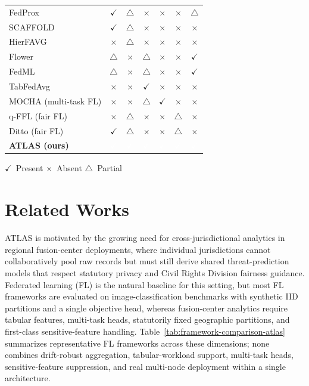 \documentclass[conference]{IEEEtran}
\newcommand{\cmarkc}{\cellcolor{goodgreen}\textcolor{black!55}{\scriptsize$\checkmark$}}
\newcommand{\xmarkc}{\cellcolor{badred}\textcolor{black!40}{\scriptsize$\times$}}
\newcommand{\tmarkc}{\cellcolor{nayellow}\textcolor{black!65}{\scriptsize$\triangle$}}
\newcommand{\cmarkA}{\cellcolor{atlasgreen}\textcolor{white}{\textbf{\scriptsize$\checkmark$}}}
\begin{document}
\begin{table}[!t]
{\begin{tabular}{l c c c c c c}
FedProx \scriptsize\cite{li2020fedprox}                     & \cmarkc & \tmarkc & \xmarkc & \xmarkc & \xmarkc & \tmarkc \\
SCAFFOLD \scriptsize\cite{karimireddy2020scaffold}          & \cmarkc & \tmarkc & \xmarkc & \xmarkc & \xmarkc & \xmarkc \\
HierFAVG \scriptsize\cite{liu2020hierfl}                    & \xmarkc & \tmarkc & \xmarkc & \xmarkc & \xmarkc & \xmarkc \\
Flower \scriptsize\cite{beutel2020flower}                   & \tmarkc & \xmarkc & \tmarkc & \xmarkc & \xmarkc & \cmarkc \\
FedML \scriptsize\cite{he2020fedml}                         & \tmarkc & \xmarkc & \tmarkc & \xmarkc & \xmarkc & \cmarkc \\
TabFedAvg \scriptsize\cite{wang2022tabular}                 & \xmarkc & \xmarkc & \cmarkc & \xmarkc & \xmarkc & \xmarkc \\
MOCHA (multi-task FL) \scriptsize\cite{smith2017mocha}      & \xmarkc & \xmarkc & \tmarkc & \cmarkc & \xmarkc & \xmarkc \\
q-FFL (fair FL) \scriptsize\cite{li2020qffl}                & \xmarkc & \tmarkc & \xmarkc & \xmarkc & \tmarkc & \xmarkc \\
Ditto (fair FL) \scriptsize\cite{li2021ditto}               & \cmarkc & \tmarkc & \xmarkc & \xmarkc & \tmarkc & \xmarkc \\
\midrule
\textbf{ATLAS (ours)}                                       & \cmarkA & \cmarkA & \cmarkA & \cmarkA & \cmarkA & \cmarkA \\
\bottomrule
\end{tabular}%
}
\vspace{2pt}
{\footnotesize \cmarkc\ Present \quad \xmarkc\ Absent \quad \tmarkc\ Partial}
\end{table}

\section{Related Works}
\label{sec:related_works}

ATLAS is motivated by the growing need for cross-jurisdictional analytics in regional fusion-center deployments, where individual jurisdictions cannot collaboratively pool raw records but must still derive shared threat-prediction models that respect statutory privacy and Civil Rights Division fairness guidance. Federated learning (FL) is the natural baseline for this setting, but most FL frameworks are evaluated on image-classification benchmarks with synthetic IID partitions and a single objective head, whereas fusion-center analytics require tabular features, multi-task heads, statutorily fixed geographic partitions, and first-class sensitive-feature handling. Table~\ref{tab:framework-comparison-atlas} summarizes representative FL frameworks across these dimensions; none combines drift-robust aggregation, tabular-workload support, multi-task heads, sensitive-feature suppression, and real multi-node deployment within a single architecture.
\end{document}
